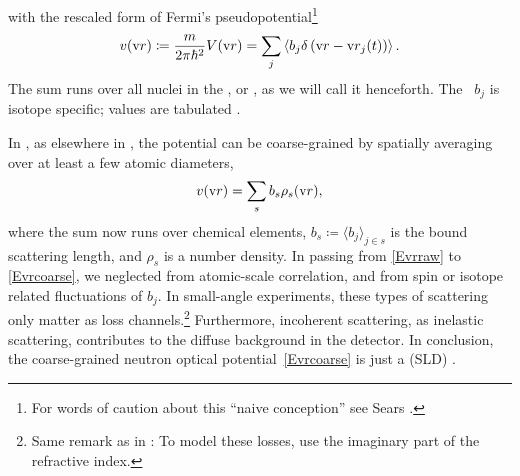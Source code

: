 with the rescaled form of Fermi's pseudopotential\footnote
{For words of caution about this ``naive conception''
see Sears \cite[p.~7]{Sea89}.}
%
%
%
%
\begin{equation}\label{Evrraw}
  v(\text{v}{r})
  \coloneqq \frac{m}{2\pi\hbar^2} V(\text{v}{r})
  = \sum_j\left\langle b_j \delta\left(\text{v}{r}-\text{v}{r}_j(t)\right)\right\rangle.
\end{equation}
The sum runs over all nuclei in the ,
%
%
or ,
%
as we will call it henceforth.
The ~$b_j$
%
%
%
is isotope specific;
%
values are tabulated \cite{Sea92}.

In ,
%
%
as elsewhere in  \cite{Sea89},
%
%
the potential can be coarse-grained by spatially averaging over at least a few atomic diameters,
\begin{equation}\label{Evrcoarse}
  v(\text{v}{r})
  = \sum_s b_s \rho_s(\text{v}{r}),
\end{equation}
%
where the sum now runs over chemical elements,
$b_s\coloneqq\langle b_j\rangle_{j\in s}$ is the bound  scattering length,
%
%
and $\rho_s$ is a number density.
%
%
%
In passing from \cref{Evrraw} to \cref{Evrcoarse},
we neglected 
%
%
from atomic-scale correlation,
%
%
and  from spin or isotope related fluctuations of $b_j$.
%
%
%
%
%
In small-angle experiments,
 these types of scattering only matter as loss channels.\footnote
{Same remark as in : To model these losses, use the
%
%
imaginary part of the refractive index.}
Furthermore, incoherent scattering, as inelastic scattering,
 contributes to the diffuse background in the detector.
%
%
%
%
%
In conclusion, the coarse-grained neutron optical potential~\cref{Evrcoarse}
%
%
%
is just a  (SLD)
%
%
\cite[eq.\ 2.8.37]{Sea89}.

